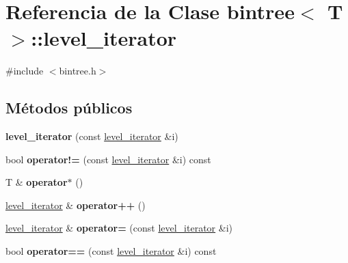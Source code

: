 \hypertarget{classbintree_1_1level__iterator}{}\section{Referencia de la Clase bintree$<$ T $>$\+:\+:level\+\_\+iterator}
\label{classbintree_1_1level__iterator}


{\ttfamily \#include $<$bintree.\+h$>$}

\subsection*{Métodos públicos}
\begin{DoxyCompactItemize}
\item 
\hypertarget{classbintree_1_1level__iterator_a2743a43a42d764094b7f88c156afddb7}{}{\bfseries level\+\_\+iterator} (const \hyperlink{classbintree_1_1level__iterator}{level\+\_\+iterator} \&i)\label{classbintree_1_1level__iterator_a2743a43a42d764094b7f88c156afddb7}

\item 
\hypertarget{classbintree_1_1level__iterator_a47c98fc52972998f6c4d20625e16fcbc}{}bool {\bfseries operator!=} (const \hyperlink{classbintree_1_1level__iterator}{level\+\_\+iterator} \&i) const \label{classbintree_1_1level__iterator_a47c98fc52972998f6c4d20625e16fcbc}

\item 
\hypertarget{classbintree_1_1level__iterator_ad889a22ad49ba9eb856d2ce2cc452313}{}T \& {\bfseries operator$\ast$} ()\label{classbintree_1_1level__iterator_ad889a22ad49ba9eb856d2ce2cc452313}

\item 
\hypertarget{classbintree_1_1level__iterator_a16ba4d7573233e52c12598c9ea2c3831}{}\hyperlink{classbintree_1_1level__iterator}{level\+\_\+iterator} \& {\bfseries operator++} ()\label{classbintree_1_1level__iterator_a16ba4d7573233e52c12598c9ea2c3831}

\item 
\hypertarget{classbintree_1_1level__iterator_ac48932df7ad256f7775f4c9adac3ea5d}{}\hyperlink{classbintree_1_1level__iterator}{level\+\_\+iterator} \& {\bfseries operator=} (const \hyperlink{classbintree_1_1level__iterator}{level\+\_\+iterator} \&i)\label{classbintree_1_1level__iterator_ac48932df7ad256f7775f4c9adac3ea5d}

\item 
\hypertarget{classbintree_1_1level__iterator_afc6be99157896e0b7dd0564afa416498}{}bool {\bfseries operator==} (const \hyperlink{classbintree_1_1level__iterator}{level\+\_\+iterator} \&i) const \label{classbintree_1_1level__iterator_afc6be99157896e0b7dd0564afa416498}

\end{DoxyCompactItemize}
